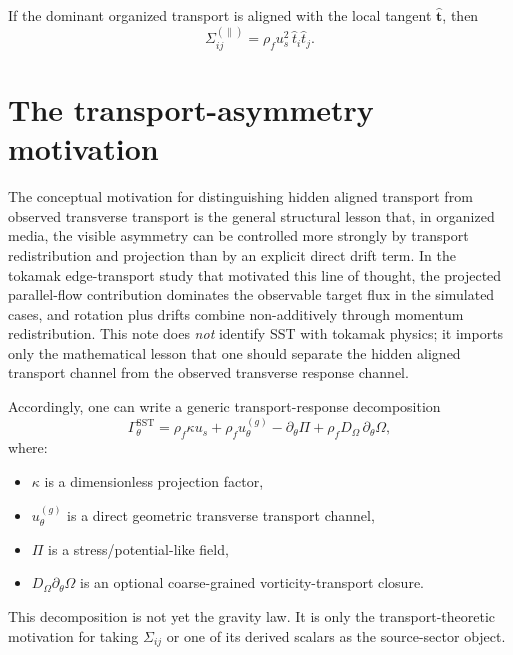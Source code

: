 \documentclass[11pt]{article}
\newcommand{\rhoF}{\rho_{\!f}}
\newcommand{\SST}{\mathrm{SST}}
\begin{document}
                If the dominant organized transport is aligned with the local tangent \(\hat{\mathbf t}\), then
                \begin{equation}
                    \Sigma_{ij}^{(\parallel)}
                    =
                    \rhoF u_s^2\,\hat t_i \hat t_j.
                    \label{eq:Sigmaij-parallel}
                \end{equation}
        
        \section{The transport-asymmetry motivation}
        
        The conceptual motivation for distinguishing hidden aligned transport from observed transverse transport is the general structural lesson that, in organized media, the visible asymmetry can be controlled more strongly by transport redistribution and projection than by an explicit direct drift term. In the tokamak edge-transport study that motivated this line of thought, the projected parallel-flow contribution dominates the observable target flux in the simulated cases, and rotation plus drifts combine non-additively through momentum redistribution. This note does \emph{not} identify SST with tokamak physics; it imports only the mathematical lesson that one should separate the hidden aligned transport channel from the observed transverse response channel.
        
        Accordingly, one can write a generic transport-response decomposition
        \begin{equation}
            \Gamma_\theta^{\SST}
            =
            \rhoF \kappa u_s
            +
            \rhoF u_\theta^{(g)}
            -
            \partial_\theta \Pi
            +
            \rhoF D_\Omega\,\partial_\theta \Omega,
            \label{eq:Gamma-theta-SST}
        \end{equation}
        where:
        \begin{itemize}
            \item \(\kappa\) is a dimensionless projection factor,
            \item \(u_\theta^{(g)}\) is a direct geometric transverse transport channel,
            \item \(\Pi\) is a stress/potential-like field,
            \item \(D_\Omega \partial_\theta \Omega\) is an optional coarse-grained vorticity-transport closure.
        \end{itemize}
        This decomposition is not yet the gravity law. It is only the transport-theoretic motivation for taking \(\Sigma_{ij}\) or one of its derived scalars as the source-sector object.
        
\end{document}
